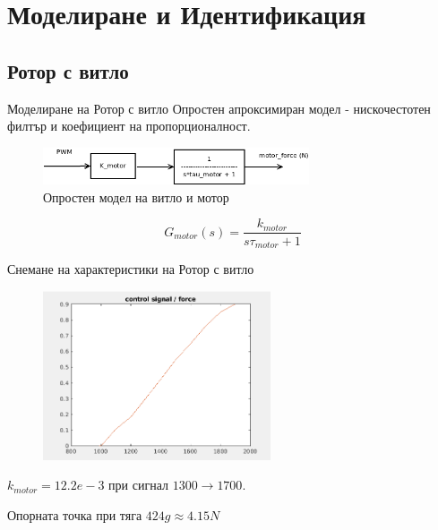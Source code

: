 \documentclass[handout]{beamer}
\begin{document}
\section{Моделиране и Идентификация}

\subsection{Ротор с витло}

\begin{frame}{Моделиране на Ротор с витло}
	Опростен апроксимиран модел - нискочестотен филтър и коефициент на пропорционалност.
	\begin{figure}[htpb!]
		\centering
		\includegraphics[width=0.7\textwidth]{Images/motor_model.png}
		\caption{Опростен модел на витло и мотор}
		\label{fig:motor_model}
	\end{figure}

	\begin{equation*}
		G_{motor}(s) = \frac{k_{motor}}{s \tau_{motor} + 1}
		\label{eqn:motor_model}
	\end{equation*}

\end{frame}

\begin{frame}{Снемане на характеристики на Ротор с витло}

\begin{figure}[htpb!]
    \centering
    \includegraphics[width=0.6\textwidth]{Images/control_force.png}
\end{figure}


\(k_{motor} = 12.2e-3\) при сигнал \(1300\to1700\).

Опорната точка при тяга \(424g \approx 4.15N\)

\end{frame}
\end{document}
